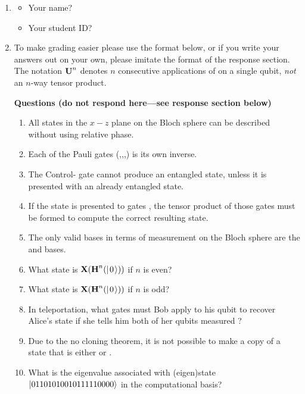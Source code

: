 \documentclass[12pt]{article}
\begin{document}
\begin{enumerate}
    \item{} \begin{itemize}
    \item Your name? \Blank[3in]{}
    \item Your student ID? \Blank[3in]{}
\end{itemize}

\item {} To make grading easier please use the format below, or if you write your answers out on your own, please imitate the format of the response section.  The notation $\mbox{\bfseries{\textrm{U}}}^{n}$ denotes $n$ consecutive applications of  on a single qubit, \emph{not} an $n$-way tensor product.

\textbf{Questions (do not respond here---see response section below)}
\begin{enumerate}[label=\theenumi.\arabic*]
   \item\label{tf:a} All states in the $x-z$ plane on the Bloch sphere can be described without using relative phase.
   \item\label{tf:b} Each of the Pauli gates (\PauliX,\PauliY,\PauliZ,\Hadamard) is its own inverse.
   \item\label{tf:c} The Control-\PauliZ{} gate cannot produce an entangled state, unless it is presented with an already entangled state.
   \item\label{tf:d} If the state  is presented to gates \TensProd{\Hadamard}{\PauliX}, the tensor product of those gates must be formed to compute the correct resulting state.
   \item\label{tf:e} The only valid bases in terms of measurement on the Bloch sphere are the \PauliZ{} and \PauliX{} bases.
   \item\label{tf:f} What state is $\PauliX(\Hadamard^{n}(\QZero))$ if $n$ is even?
      \item\label{tf:g} What state is $\PauliX(\Hadamard^{n}(\QZero))$ if $n$ is odd?
    \item\label{tf:h} In teleportation, what gates must Bob apply to his qubit to recover Alice's state if she tells him both of her qubits measured \QOne{}?
    \item\label{tf:i} Due to the no cloning theorem, it is not possible to make a copy of a state that is either \QZero{} or \QOne{}.
    \item\label{tf:j} What is the eigenvalue associated with (eigen)state $\ket{01101010010111110000}$ in the computational basis?
\end{enumerate}


\end{enumerate}
\end{document}

